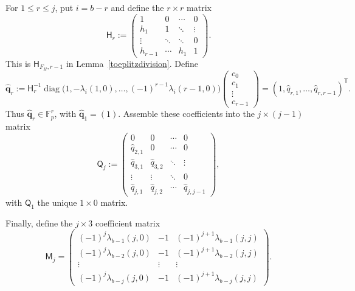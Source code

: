 \documentclass[12pt]{article}
\theoremstyle{remark}
\newcommand{\F}{\mathbb{F}_p}
\begin{document}
For $1\le r\le j$, put $i=b-r$ and define the $r\times r$ matrix
\begin{equation*}
 \mathsf H_r:=
 \begin{pmatrix}
 1&0&\cdots&0\\
 h_1&1&\ddots&\vdots\\
 \vdots&\ddots&\ddots&0\\
 h_{r-1}&\cdots&h_1&1
 \end{pmatrix}.
\end{equation*}
This is $\mathsf H_{F_H,r-1}$ in Lemma~\ref{toeplitzdivision}.  Define
\begin{equation}\label{history_quotient_vector}
 \widehat{\mathbf q}_r:=
 \mathsf H_r^{-1}
 \operatorname{diag}\!\bigl(
  1,-\lambda_i(1,0),\ldots,(-1)^{r-1}\lambda_i(r-1,0)
 \bigr)
 \begin{pmatrix}c_0\\c_1\\\vdots\\c_{r-1}\end{pmatrix}
 =(1,\widehat q_{r,1},\ldots,\widehat q_{r,r-1})^{\mathsf T}.
\end{equation}
Thus $\widehat{\mathbf q}_r\in\F^r$, with
$\widehat{\mathbf q}_1=(1)$.  Assemble these coefficients into the
$j\times(j-1)$ matrix
\begin{equation*}
 \mathsf Q_j:=
 \begin{pmatrix}
 0&0&\cdots&0\\
 \widehat q_{2,1}&0&\cdots&0\\
 \widehat q_{3,1}&\widehat q_{3,2}&\ddots&\vdots\\
 \vdots&\vdots&\ddots&0\\
 \widehat q_{j,1}&\widehat q_{j,2}&\cdots&\widehat q_{j,j-1}
 \end{pmatrix},
\end{equation*}
with $\mathsf Q_1$ the unique $1\times0$ matrix.

Finally, define the $j\times3$ coefficient matrix
\begin{equation}\label{row}
 \mathsf M_j=
 \begin{pmatrix}
 (-1)^j\lambda_{b-1}(j,0)&-1&(-1)^{j+1}\lambda_{b-1}(j,j)\\
 (-1)^j\lambda_{b-2}(j,0)&-1&(-1)^{j+1}\lambda_{b-2}(j,j)\\
 \vdots&\vdots&\vdots\\
 (-1)^j\lambda_{b-j}(j,0)&-1&(-1)^{j+1}\lambda_{b-j}(j,j)
 \end{pmatrix}.
\end{equation}
\end{document}
